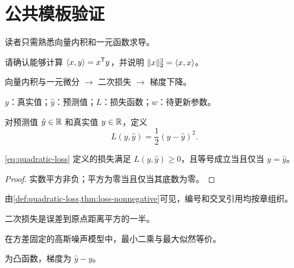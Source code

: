 \documentclass[UTF8,a4paper,11pt,openany]{ctexbook}
\begin{document}
\frontmatter
\SLMakeTitle
\SLPrintContents
\mainmatter
\chapter{公共模板验证}\label{chap:template-demo}
\begin{prerequisitebox}
读者只需熟悉向量内积和一元函数求导。
\end{prerequisitebox}
\begin{precheckbox}
请确认能够计算 $\langle x,y\rangle=x^{\mathsf T}y$，并说明 $\lVert x\rVert_2^2=\langle x,x\rangle$。
\end{precheckbox}
\begin{dependencybox}
向量内积与一元微分 $\longrightarrow$ 二次损失 $\longrightarrow$ 梯度下降。
\end{dependencybox}
\begin{symboltablebox}
$y$：真实值；$\hat y$：预测值；$L$：损失函数；$w$：待更新参数。
\end{symboltablebox}
\begin{definition}[二次损失]\label{def:quadratic-loss}
对预测值 $\hat y\in\mathbb{R}$ 和真实值 $y\in\mathbb{R}$，定义
\begin{equation}\label{eq:quadratic-loss}
  L(y,\hat y)=\frac{1}{2}(y-\hat y)^2.
\end{equation}
\end{definition}
\begin{theorem}[非负性]\label{thm:loss-nonnegative}
\cref{eq:quadratic-loss} 定义的损失满足 $L(y,\hat y)\ge 0$，且等号成立当且仅当 $y=\hat y$。
\end{theorem}
\begin{proof}
实数平方非负；平方为零当且仅当其底数为零。
\end{proof}
由\cref{def:quadratic-loss,thm:loss-nonnegative}可见，编号和交叉引用均按章组织。

\begin{geometrybox}
二次损失是误差到原点距离平方的一半。
\end{geometrybox}
\begin{probabilitybox}
在方差固定的高斯噪声模型中，最小二乘与最大似然等价。
\end{probabilitybox}
\begin{optimizationbox}
为凸函数，梯度为 $\hat y-y$。
\end{optimizationbox}
\end{document}
